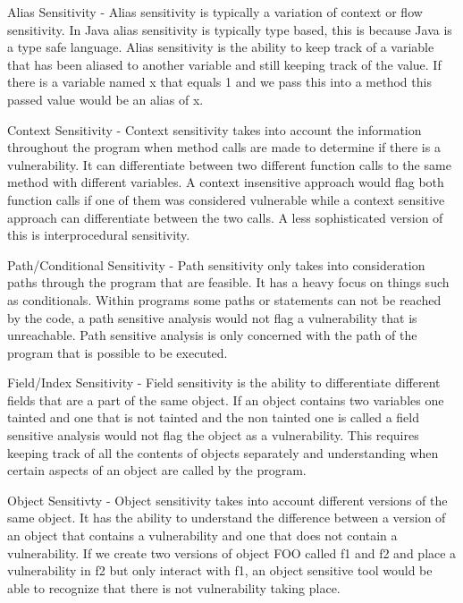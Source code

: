 Alias Sensitivity - Alias sensitivity is typically a variation of context or flow sensitivity. In Java alias sensitivity is typically type based, this is because Java is a type safe language. Alias sensitivity is the ability to keep track of a variable that has been aliased to another variable and still keeping track of the value. If there is a variable named x that equals 1 and we pass this into a method this passed value would be an alias of x.

Context Sensitivity - Context sensitivity takes into account the information throughout the program when method calls are made to determine if there is a vulnerability. It can differentiate between two different function calls to the same method with different variables. A context insensitive approach would flag both function calls if one of them was considered vulnerable while a context sensitive approach can differentiate between the two calls. A less sophisticated version of this is interprocedural sensitivity.

Path/Conditional Sensitivity - Path sensitivity only takes into consideration paths through the program that are feasible. It has a heavy focus on things such as conditionals. Within programs some paths or statements can not be reached by the code, a path sensitive analysis would not flag a vulnerability that is unreachable. Path sensitive analysis is only concerned with the path of the program that is possible to be executed.

Field/Index Sensitivity - Field sensitivity is the ability to differentiate different fields that are a part of the same object. If an object contains two variables one tainted and one that is not tainted and the non tainted one is called a field sensitive analysis would not flag the object as a vulnerability. This requires keeping track of all the contents of objects separately and understanding when certain aspects of an object are called by the program.
    
Object Sensitivty - Object sensitivity takes into account different versions of the same object. It has the ability to understand the difference between a version of an object that contains a vulnerability and one that does not contain a vulnerability. If we create two versions of object FOO called f1 and f2 and place a vulnerability in f2 but only interact with f1, an object sensitive tool would be able to recognize that there is not vulnerability taking place.

